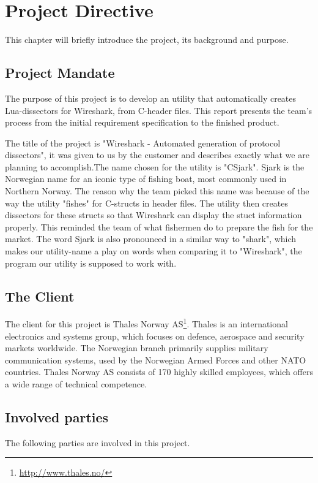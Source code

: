 \chapter{Project Directive}
This chapter will briefly introduce the project, its background and purpose.


\section{Project Mandate}
The purpose of this project is to develop an utility that automatically creates Lua-dissectors for Wireshark, from C-header files. This report presents the team’s process from the initial requirement specification to the finished product. 

The title of the project is "Wireshark - Automated generation of protocol dissectors", it was given to us by the customer and describes exactly what we are planning
to accomplish.The name chosen for the utility is "CSjark". Sjark is the Norwegian name for an iconic type of fishing boat, most commonly used in Northern Norway. The reason why the team picked this name was because of the way the utility "fishes" for C-structs in header files. The utility then creates dissectors for these structs so that Wireshark can display the stuct information properly. This reminded the team of what fishermen do to prepare the fish for the market. The word Sjark is also pronounced in a similar way to "shark", which makes our utility-name a play on words when comparing it to "Wireshark", the program our utility is supposed to work with.


\section{The Client}
The client for this project is
Thales Norway AS\footnote{\url{http://www.thales.no/}}. Thales is an
international electronics and systems group, which focuses on defence,
aerospace and security markets worldwide. The Norwegian branch primarily
supplies military communication systems, used by the Norwegian Armed Forces
and other NATO countries. Thales Norway AS consists of 170 highly skilled
employees, which offers a wide range of technical competence.


\section{Involved parties}
The following parties are involved in this project.

